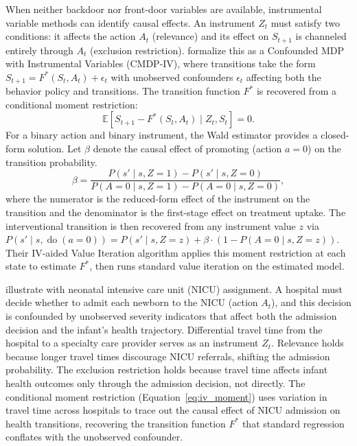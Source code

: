 When neither backdoor nor front-door variables are available, instrumental variable methods can identify causal effects. An instrument $Z_t$ must satisfy two conditions: it affects the action $A_t$ (relevance) and its effect on $S_{t+1}$ is channeled entirely through $A_t$ (exclusion restriction). \citet{liao2024_iv_rl} formalize this as a Confounded MDP with Instrumental Variables (CMDP-IV), where transitions take the form $S_{t+1} = F^*(S_t, A_t) + \epsilon_t$ with unobserved confounders $\epsilon_t$ affecting both the behavior policy and transitions. The transition function $F^*$ is recovered from a conditional moment restriction:
\begin{equation}
\mathbb{E}[S_{t+1} - F^*(S_t, A_t) \mid Z_t, S_t] = 0.
\label{eq:iv_moment}
\end{equation}
For a binary action and binary instrument, the Wald estimator provides a closed-form solution. Let $\beta$ denote the causal effect of promoting (action $a = 0$) on the transition probability.
\begin{equation}
\beta = \frac{P(s' \mid s, Z{=}1) - P(s' \mid s, Z{=}0)}{P(A{=}0 \mid s, Z{=}1) - P(A{=}0 \mid s, Z{=}0)},
\label{eq:wald}
\end{equation}
where the numerator is the reduced-form effect of the instrument on the transition and the denominator is the first-stage effect on treatment uptake. The interventional transition is then recovered from any instrument value $z$ via $P(s' \mid s, \operatorname{do}(a{=}0)) = P(s' \mid s, Z{=}z) + \beta \cdot (1 - P(A{=}0 \mid s, Z{=}z))$. Their IV-aided Value Iteration algorithm applies this moment restriction at each state to estimate $F^*$, then runs standard value iteration on the estimated model.

\citet{liao2024_iv_rl} illustrate with neonatal intensive care unit (NICU) assignment. A hospital must decide whether to admit each newborn to the NICU (action $A_t$), and this decision is confounded by unobserved severity indicators that affect both the admission decision and the infant's health trajectory. Differential travel time from the hospital to a specialty care provider serves as an instrument $Z_t$. Relevance holds because longer travel times discourage NICU referrals, shifting the admission probability. The exclusion restriction holds because travel time affects infant health outcomes only through the admission decision, not directly. The conditional moment restriction (Equation~\ref{eq:iv_moment}) uses variation in travel time across hospitals to trace out the causal effect of NICU admission on health transitions, recovering the transition function $F^*$ that standard regression conflates with the unobserved confounder.

